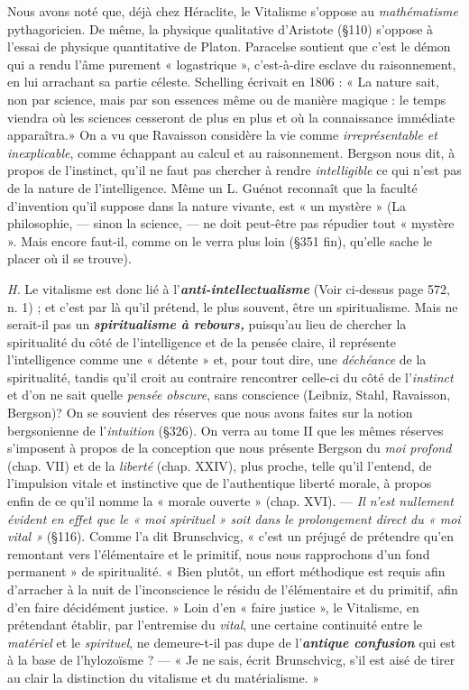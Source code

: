 \vspace{0.24cm}
{\footnotesize Nous avons noté que, déjà chez Héraclite, le Vitalisme s'oppose au
{\it mathématisme} pythagoricien. De même, la physique qualitative d'Aristote
(\S 110) s'oppose à l’essai de physique quantitative de Platon. Paracelse
soutient que c’est le démon qui a rendu l’âme purement « logastrique »,
c'est-à-dire esclave du raisonnement, en lui arrachant sa partie céleste.
Schelling écrivait en 1806 : « La nature sait, non par science, mais par
son essences même ou de manière magique : le temps viendra où les sciences
cesseront de plus en plus et où la connaissance immédiate apparaîtra.» On
a vu que Ravaisson considère la vie comme {\it irreprésentable et inexplicable},
comme échappant au calcul et au raisonnement. Bergson nous dit, à propos
de l'instinct, qu’il ne faut pas chercher à rendre {\it intelligible} ce qui n’est
pas de la nature de l'intelligence. Même un L. Guénot reconnaît que la
faculté d'invention qu’il suppose dans la nature vivante, est « un mystère »
{\scriptsize (La philosophie, — sinon la science, — ne doit peut-être pas répudier tout « mystère ».
Mais encore faut-il, comme on le verra plus loin (\S 351 fin), qu’elle sache le placer
où il se trouve)}.}
\vspace{0.31cm}


{\it H.} Le vitalisme est donc lié à l’\textbf{\textit {anti-intellectualisme}}
{\scriptsize (Voir ci-dessus page 572, n. 1)} ; et c’est
par là qu’il prétend, le plus souvent, être un spiritualisme. Mais ne
serait-il pas un \textbf{\textit {spiritualisme à rebours,}} puisqu’au lieu de chercher
la spiritualité du côté de l'intelligence et de la pensée claire, il
représente l'intelligence comme une « détente » et, pour tout dire,
une {\it déchéance} de la spiritualité, tandis qu’il croit au contraire rencontrer
celle-ci du côté de l'{\it instinct} et d’on ne sait quelle {\it pensée obscure},
sans conscience (Leibniz, Stahl, Ravaisson, Bergson)? On se souvient
des réserves que nous avons faites sur la notion bergsonienne de
l'{\it intuition} (\S 326). On verra au tome II que les mêmes réserves s’imposent
à propos de la conception que nous présente Bergson du {\it moi
profond} (chap. VII) et de la {\it liberté} (chap. XXIV), plus proche, telle
qu’il l’entend, de l’impulsion vitale et instinctive que de l’authentique
liberté morale, à propos enfin de ce qu’il nomme la « morale ouverte »
(chap. XVI). — {\it Il n’est nullement évident en effet que le « moi spirituel »
soit dans le prolongement direct du « moi vital »} (\S 116). Comme l’a dit
Brunschvicg, « c’est un préjugé de prétendre qu’en remontant vers
l’élémentaire et le primitif, nous nous rapprochons d’un fond permanent »
de spiritualité. « Bien plutôt, un effort méthodique est requis
afin d’arracher à la nuit de l’inconscience le résidu de l’élémentaire et
du primitif, afin d’en faire décidément justice. » Loin d’en « faire
justice », le Vitalisme, en prétendant établir, par l’entremise du {\it vital},
une certaine continuité entre le {\it matériel} et le {\it spirituel}, ne demeure-t-il
pas dupe de l’\textbf{\textit {antique confusion}} qui est à la base de l’hylozoïsme ?
— « Je ne sais, écrit Brunschvicg, s’il est aisé de tirer au clair la
distinction du vitalisme et du matérialisme. »

